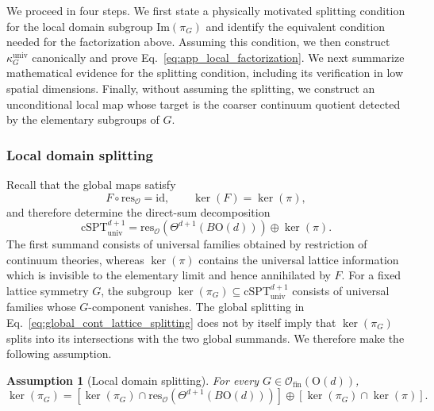 \documentclass[aps,prx,reprint,superscriptaddress,twocolumn,amsmath,amssymb,amsfonts, nofootinbib]{revtex4-2}
\newcommand{\csptu}{\mathrm{cSPT}^{d+1}_{\mathrm{univ}}}
\newcommand{\ofin}{\mathcal{O}_{\text{fin}}}
\newcommand{\res}{\text{res}}
\theoremstyle{apsstyle}
\newtheorem{assumption}{Assumption}
\begin{document}
We proceed in four steps. We first state a physically motivated splitting condition for the local domain subgroup $\mathrm{Im}(\pi_G)$ and identify the equivalent condition needed for the factorization above. Assuming this condition, we then construct $\kappa_G^{\mathrm{univ}}$ canonically and prove Eq.~\ref{eq:app_local_factorization}. We next summarize mathematical evidence for the splitting condition, including its verification in low spatial dimensions. Finally, without assuming the splitting, we construct an unconditional local map whose target is the coarser continuum quotient detected by the elementary subgroups of $G$.

\subsubsection{Local domain splitting}
\label{app:local_domain_splitting}

Recall that the global maps satisfy
\begin{equation*}
    F\circ \res_{\mathcal O}=\mathrm{id},
    \qquad
    \ker(F)=\ker(\pi),
\end{equation*}
and therefore determine the direct-sum decomposition
\begin{equation}
    \csptu
    =
    \res_{\mathcal O}\!\left(\Theta^{d+1}(B\mathrm{O}(d))\right)
    \oplus
    \ker(\pi).
    \label{eq:global_cont_lattice_splitting}
\end{equation}
The first summand consists of universal families obtained by restriction of continuum theories, whereas $\ker(\pi)$ contains the universal lattice information which is invisible to the elementary limit and hence annihilated by $F$.
For a fixed lattice symmetry $G$, the subgroup $\ker(\pi_G)\subseteq\csptu$ consists of universal families whose $G$-component vanishes. The global splitting in Eq.~\ref{eq:global_cont_lattice_splitting} does not by itself imply that $\ker(\pi_G)$ splits into its intersections with the two global summands. We therefore make the following assumption.

\bigskip 

\begin{assumption}[Local domain splitting]
\label{assump:local_domain_splitting}
For every $G\in\ofin(\mathrm{O}(d))$,
\begin{equation}
    \ker(\pi_G)
    =
    \left[
        \ker(\pi_G)
        \cap
        \res_{\mathcal O}\!\left(\Theta^{d+1}(B\mathrm{O}(d))\right)
    \right]
    \oplus
    \left[
        \ker(\pi_G)\cap\ker(\pi)
    \right].
    \label{eq:local_domain_splitting}
\end{equation}
\end{assumption}
\end{document}
